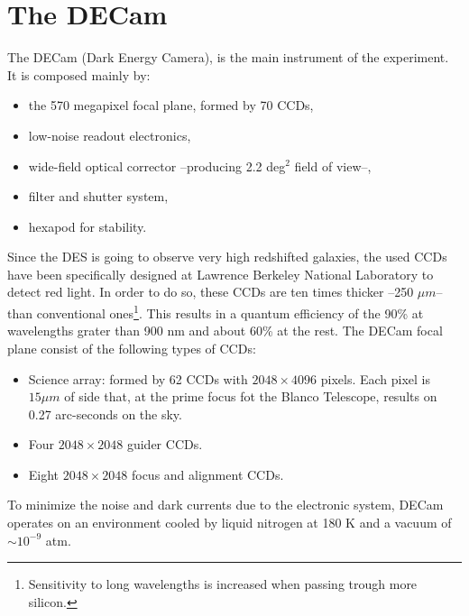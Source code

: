 \section{The DECam}
The DECam (Dark Energy Camera), is the main instrument of the experiment. It is composed mainly by:
\begin{itemize}
	\item the 570 megapixel focal plane, formed by 70 CCDs,
    \item low-noise readout electronics,
    \item wide-field optical corrector --producing 2.2 deg$^2$ field of view--,
    \item filter and shutter system,
    \item hexapod for stability.   
\end{itemize}
Since the DES is going to observe very high redshifted galaxies, the used CCDs have been specifically designed at Lawrence Berkeley National Laboratory to detect red light. In order to do so, these CCDs are ten times thicker --250 $\mu m$-- than conventional ones\footnote{Sensitivity to long wavelengths is increased when passing trough more silicon.}. This results in a quantum efficiency of the 90\% at wavelengths grater than 900 nm and about 60\% at the rest. The DECam focal plane consist of the following types of CCDs:
\begin{itemize}
\item Science array: formed by 62 CCDs with $2048\times 4096$ pixels. Each pixel is $15\mu m$ of side that, at the prime focus fot the  Blanco Telescope, results on 0.27 arc-seconds on the sky.
\item Four $2048\times2048$ guider CCDs.
\item Eight $2048\times 2048$ focus and alignment CCDs.
\end{itemize}
To minimize the noise and dark currents due to the electronic system, DECam operates on an environment cooled by liquid nitrogen at 180 K and a vacuum of $\sim 10^{-9}$ atm.
\newline

